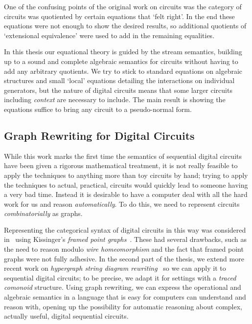 One of the confusing points of the original work on circuits was the category
of circuits was quotiented by certain equations that `felt right'.
In the end these equations were not enough to show the desired results,
so additional quotients of `extensional equivalence' were used to add in the
remaining equalities.

In this thesis our equational theory is guided by the stream semantics,
building up to a sound and complete algebraic semantics for circuits without
having to add any arbitrary quotients.
We try to stick to standard equations on algebraic structures and small `local'
equations detailing the interactions on individual generators, but the nature of
digital circuits means that some larger circuits including \emph{context} are
necessary to include.
The main result is showing the equations suffice to bring any circuit to a
pseudo-normal form.

\subsection{Graph Rewriting for Digital Circuits}

While this work marks the first time the semantics of sequential digital
circuits have been given a rigorous mathematical treatment, it is not really
feasible to apply the techniques to anything more than toy circuits by hand;
trying to apply the techniques to actual, practical, circuits would quickly lead
to someone having a very bad time.
Instead it is desirable to have a computer deal with all the hard work
for us and reason \emph{automatically}.
To do this, we need to represent circuits \emph{combinatorially} as graphs.

Representing the categorical syntax of digital circuits in this way was
considered in~\cite{ghica2017diagrammatic} using
Kissinger's \emph{framed point graphs}~\cite{kissinger2012pictures}.
These had several drawbacks, such as the need to reason modulo
\emph{wire homeomorphism} and the fact that framed point graphs were not fully
adhesive.
In the second part of the thesis, we extend more recent work on
\emph{hypergraph string diagram rewriting}~\cite{bonchi2022string,bonchi2022stringa,bonchi2022stringb}
so we can apply it to sequential digital circuits; to be precise, we adapt it
for settings with a \emph{traced comonoid} structure.
Using graph rewriting, we can express the operational and algebraic semantics
in a language that is easy for computers can understand and reason with, opening
up the possibility for automatic reasoning about complex, actually useful,
digital sequential circuits.

